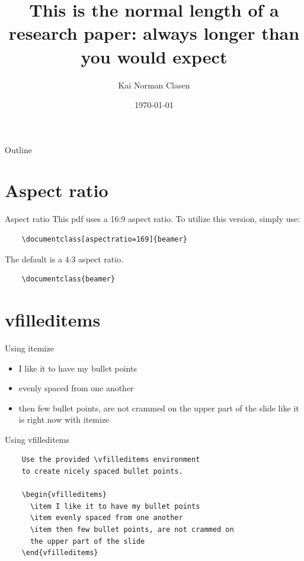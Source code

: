 \documentclass{beamer}
\title[short title]{This is the normal length of a research paper:
always longer than you would expect}
\author{Kai Norman Clasen}
\institute{Institute name}
\date{\today}
\begin{document}
\maketitle

\begin{frame}{Outline}
    \tableofcontents
\end{frame}

\section{Aspect ratio}
\begin{frame}[fragile]{Aspect ratio}
    This pdf uses a 16:9 aspect ratio. To utilize
    this version, simply use:
    \begin{verbatim}
    \documentclass[aspectratio=169]{beamer}
    \end{verbatim}
    \vfill
    The default is a 4:3 aspect ratio.
    \begin{verbatim}
    \documentclass{beamer}
  \end{verbatim}
\end{frame}

\section{vfilleditems}
\begin{frame}{Using itemize}
    \begin{itemize}
        \item I like it to have my bullet points
        \item evenly spaced from one another
        \item then few bullet points, are not crammed on
              the upper part of the slide
              like it is right now with itemize
    \end{itemize}
\end{frame}

\begin{frame}[fragile]{Using vfilleditems}
    \begin{verbatim}
    Use the provided \vfilleditems environment
    to create nicely spaced bullet points.

    \begin{vfilleditems}
      \item I like it to have my bullet points
      \item evenly spaced from one another
      \item then few bullet points, are not crammed on
      the upper part of the slide
    \end{vfilleditems}
    \end{verbatim}
\end{frame}
\end{document}

